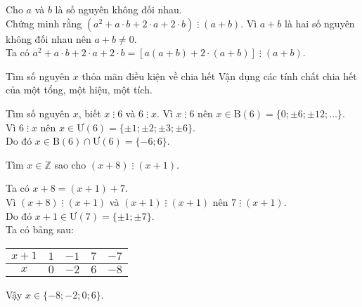 \begin{vd}%
Cho $ a $ và $ b $ là số nguyên không đối nhau.\\
Chứng minh rằng $ (a^2+a \cdot b+2\cdot a+2\cdot b) \;\vdots\;(a+b) $.
	\loigiai
	{
Vì $ a+b $ là hai số nguyên không đối nhau nên $ a+b \ne 0 $.\\
Ta có $ a^2+a \cdot b+2\cdot a+2\cdot b=[a(a+b)+2\cdot (a+b)] \;\vdots\;(a+b) $.		
	}
\end{vd}





\begin{dang}{Tìm số nguyên $ x $ thỏa mãn điều kiện về chia hết}
Vận dụng các tính chất chia hết của một tổng, một hiệu, một tích.
\end{dang}

\begin{vd}%
Tìm số nguyên $ x $, biết $ x\;\vdots\;6 $ và $ 6\;\vdots\;x $. 		
	\loigiai
	{
Vì $ x\;\vdots\;6 $ nên $ x\in \mathrm{B}(6)=\{0;\pm 6;\pm 12;\ldots\} $.\\
Vì $ 6\;\vdots\;x $ nên $ x\in \mathrm{\text{Ư}}(6)=\{\pm 1;\pm 2;\pm 3;\pm 6\} $.\\
Do đó $ x\in \mathrm{B}(6) \cap \mathrm{\text{Ư}}(6)=\{-6;6\} $.	
	}
\end{vd}

\begin{vd}%
Tìm $ x\in \mathbb{Z} $ sao cho $ (x+8) \;\vdots\;(x+1) $.	
	\loigiai
	{
Ta có $ x+8=(x+1)+7 $.\\
Vì $ (x+8) \;\vdots\;(x+1) $ và $ (x+1) \;\vdots\;(x+1) $ nên $ 7 \;\vdots\;(x+1) $.\\
Do đó $ x+1 \in \mathrm{\text{Ư}}(7)=\{\pm 1; \pm 7\} $.\\
Ta có bảng sau:
\begin{center}
	\begin{tabular}{|c|c|c|c|c|} 
		\hline
		$x+1$ & $1$ & $-1$ & $7$ & $-7$  \\ [1ex]
		\hline
		$x$ & $0$ & $-2$ & $6$ & $-8$  \\ [1ex]
		\hline
	\end{tabular}
\end{center}
Vậy $ x\in \{-8; -2; 0; 6\} $.
	}
\end{vd}


